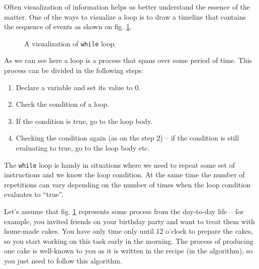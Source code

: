 \documentclass[../sparc.tex]{subfiles}
\begin{document}
Often visualization of information helps us better understand the essence of the
matter.  One of the ways to visualize a loop is to draw a timeline that contains
the sequence of events as shown on fig. \ref{fig:control-flow-while-loop}.

\begin{figure}[ht]
  \centering
  \label{fig:control-flow-while-loop}
  \caption{A visualization of \texttt{while} loop.}
\end{figure}

As we can see here a loop is a process that spans over some period of time.
This process can be divided in the following steps:

\begin{enumerate}
\item Declare a variable and set its value to 0.
\item Check the condition of a loop.
\item If the condition is true, go to the loop body.
\item Checking the condition again (as on the step 2) -- if the condition is
  still evaluating to true, go to the loop body etc.
\end{enumerate}

The \texttt{while} loop is handy in situations where we need to repeat some set
of instructions and we know the loop condition.  At the same time the number of
repetitions can vary depending on the number of times when the loop condition
evaluates to ``true''.

Let's assume that fig. \ref{fig:control-flow-while-loop} represents some process
from the day-to-day life -- for example, you invited friends on your birthday
party and want to treat them with home-made cakes.  You have only time only
until 12 o'clock to prepare the cakes, so you start working on this task early
in the morning.  The process of producing one cake is well-known to you as it is
written in the recipe (in the algorithm), so you just need to follow this
algorithm.
\end{document}
